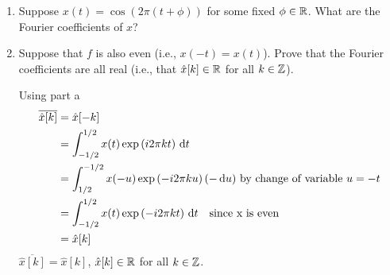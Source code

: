\documentclass[12pt,twoside]{article}
\begin{document}
\begin{enumerate}
\begin{enumerate}
  \item Suppose $x(t)=\cos(2\pi(t+\phi))$ for some fixed
    $\phi\in\mathbb{R}$.  What are the Fourier coefficients of $x$?
  \item Suppose that $f$ is also even (i.e., $x(-t)=x(t)$).  Prove
    that the Fourier coefficients are all real (i.e., that
    $\hat{x}[k]\in\mathbb{R}$ for all $k\in\mathbb{Z}$).
    
    Using part a
      \begin{align*}
      	\overline{\hat{x}[k]}	&= 	\hat{x}[-k] \\
					&= 	\int_{-1/2}^{1/2} x(t) \exp \left( i 2 \pi k t \right)  \, \text{d}t \\
					&= 	\int_{1/2}^{-1/2} x(-u) \exp \left( - i 2 \pi k u \right)  (- \, \text{d}u)  \text{ by change of variable } u = -t \\
					&=	\int_{-1/2}^{1/2} x(t) \exp \left( - i 2 \pi k t \right)  \, \text{d}t \text{ ~ since x is even }\\
					&=	\hat{x}[k] \\
       \end{align*}  
       $\overline{\hat{x}[k]} = \hat{x}[k]$, $\hat{x}[k]  \in \mathbb{R}$ for all $k\in\mathbb{Z}$.
       
  \end{enumerate} 
   
 \end{enumerate}
\end{document}
